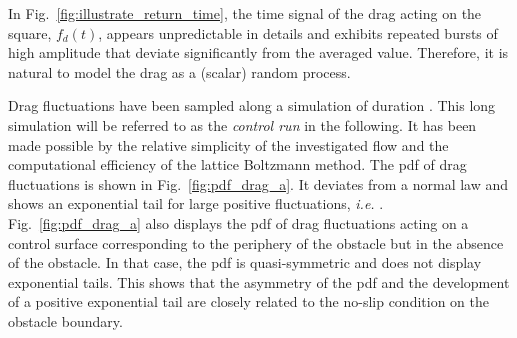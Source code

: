 \documentclass{jfm}
\newcommand{\EL}[1]{{\color{myred}{#1}}}
\begin{document}
%
In Fig.~\ref{fig:illustrate_return_time},
the time signal of the drag acting on the square, $f_d(t)$, appears unpredictable in details and exhibits repeated bursts of high amplitude that deviate significantly from the averaged value.
Therefore, it is natural to model the drag as a (scalar) random process.

Drag fluctuations have been sampled along a simulation of duration \EL{$T_{tot} = 4\times 10^6~T_0$}.
This long simulation will be referred to as the \textit{control run} in the following.
It has been made possible by the relative simplicity of the investigated flow and the computational efficiency of the lattice Boltzmann method. 
The \ac{pdf} of drag fluctuations is shown in Fig.~\ref{fig:pdf_drag_a}.
It deviates from a normal law and shows an exponential tail for large positive fluctuations, \textit{i.e.}  \EL{${\mathbb{P}}(f_d) \propto e^{-\ell f_d}$}.
%
Fig.~\ref{fig:pdf_drag_a} also displays the \ac{pdf} of drag fluctuations acting on a control surface corresponding to the periphery of the obstacle but in the absence of the obstacle. 
%
In that case, the \ac{pdf} is quasi-symmetric and does not display exponential tails. This shows that the asymmetry of the \ac{pdf} and the development of a positive exponential tail are closely related to the no-slip condition on the obstacle boundary.
\end{document}
